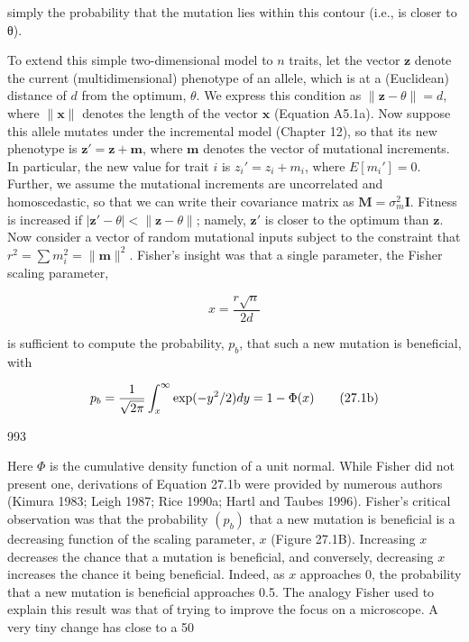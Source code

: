 \documentclass{article}
\begin{document}
simply the probability that the mutation lies within this contour (i.e., is closer to θ).

To extend this simple two-dimensional model to $n$ traits, let the vector $\mathbf{z}$ denote the current (multidimensional) phenotype of an allele, which is at a (Euclidean) distance of $d$ from the optimum, $\theta$. We express this condition as $\|\mathbf{z} - \theta\| = d$, where $\|\mathbf{x}\|$ denotes the length of the vector $\mathbf{x}$ (Equation A5.1a). Now suppose this allele mutates under the incremental model (Chapter 12), so that its new phenotype is $\mathbf{z}' = \mathbf{z} + \mathbf{m}$, where $\mathbf{m}$ denotes the vector of mutational increments. In particular, the new value for trait $i$ is $z_i' = z_i + m_i$, where $E[m_i'] = 0$. Further, we assume the mutational increments are uncorrelated and homoscedastic, so that we can write their covariance matrix as $\mathbf{M} = \sigma_m^2 \mathbf{I}$. Fitness is increased if $|\mathbf{z}' - \theta| < \|\mathbf{z} - \theta\|$; namely, $\mathbf{z}'$ is closer to the optimum than $\mathbf{z}$. Now consider a vector of random mutational inputs subject to the constraint that $r^2 = \sum m_i^2 = \|\mathbf{m}\|^2$. Fisher's insight was that a single parameter, the Fisher scaling parameter,

\begin{equation}
x=\frac{r\sqrt{n}}{2d}
\tag{27.1a}
\label{eq:27_1a}
\end{equation}

is sufficient to compute the probability,  $ p_{b} $, that such a new mutation is beneficial, with

\begin{equation}
\begin{align*}p_b={1\over\sqrt{2\pi}}\int_x^\infty\exp(-y^2/2)dy=1-\Phi(x)\end{align*}
\tag{27.1b}
\label{eq:27_1b}
\end{equation}

993

Here  $ \Phi $ is the cumulative density function of a unit normal. While Fisher did not present one, derivations of Equation 27.1b were provided by numerous authors (Kimura 1983; Leigh 1987; Rice 1990a; Hartl and Taubes 1996). Fisher's critical observation was that the probability  $ (p_b) $ that a new mutation is beneficial is a decreasing function of the scaling parameter,  $ x $ (Figure 27.1B). Increasing  $ x $ decreases the chance that a mutation is beneficial, and conversely, decreasing  $ x $ increases the chance it being beneficial. Indeed, as  $ x $ approaches 0, the probability that a new mutation is beneficial approaches 0.5. The analogy Fisher used to explain this result was that of trying to improve the focus on a microscope. A very tiny change has close to a 50%
\end{document}
